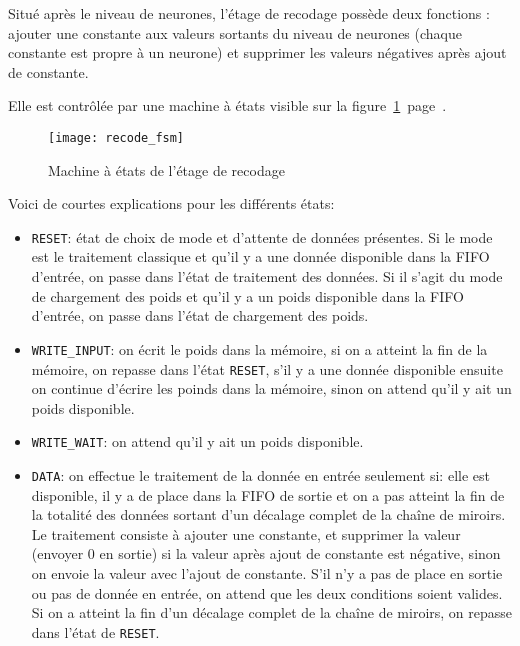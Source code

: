 Situé après le niveau de neurones, l'étage de recodage possède deux fonctions :
ajouter une constante aux valeurs sortants du niveau de neurones (chaque
constante est propre à un neurone) et
supprimer les valeurs négatives après ajout de constante.

Elle est contrôlée par une machine à états visible sur la
figure~\ref{fig:recode_fsm}~page~\pageref{fig:recode_fsm}.

\begin{figure}[h!]
	\texttt{[image: recode\_fsm]}
	\caption{Machine à états de l'étage de recodage}
	\label{fig:recode_fsm}
\end{figure}

Voici de courtes explications pour les différents états:
\begin{itemize}
	\item \verb+RESET+: état de choix de mode et d'attente de données présentes.
		Si le mode est le traitement classique et qu'il y a une donnée
		disponible dans la FIFO d'entrée, on passe dans l'état de traitement
		des données. Si il s'agit du mode de chargement des poids
		et qu'il y a un poids disponible dans la FIFO d'entrée, on passe dans l'état
		de chargement des poids.
	\item \verb+WRITE_INPUT+: on écrit le poids dans la mémoire,
		si on a atteint la fin de la mémoire, on repasse dans l'état \verb+RESET+,
		s'il y a une donnée
		disponible ensuite on continue d'écrire les poinds dans la mémoire,
		sinon on attend qu'il y ait un poids disponible.
	\item \verb+WRITE_WAIT+: on attend qu'il y ait un poids disponible.
	\item \verb+DATA+: on effectue le traitement de la donnée en entrée seulement si:
		elle est disponible, il y a de place dans la FIFO de sortie et on a pas atteint
		la fin de la totalité des données sortant d'un décalage complet de la chaîne
		de miroirs. Le traitement consiste à ajouter une constante, et supprimer la valeur
		(envoyer 0 en sortie) si la valeur après ajout de constante est négative, sinon on
		envoie la valeur avec l'ajout de constante.
		S'il n'y a pas de place en sortie ou pas de donnée en entrée, on attend que les deux conditions
		soient valides.
		Si on a atteint la fin d'un décalage complet de la chaîne de miroirs, on repasse dans
		l'état de \verb+RESET+.
\end{itemize}

